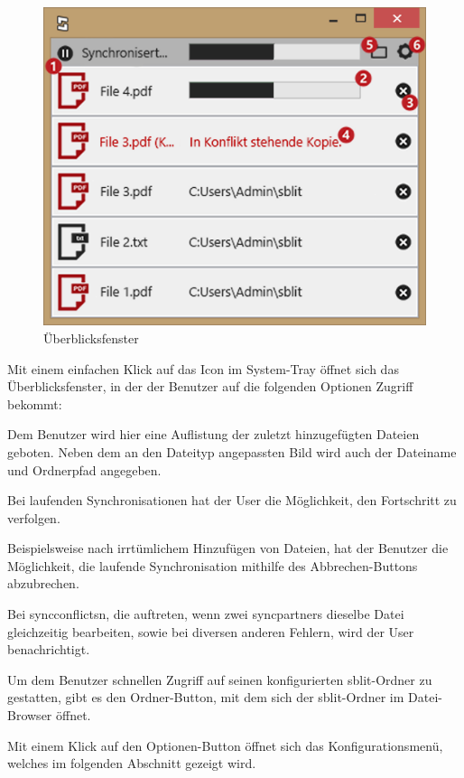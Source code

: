 \begin{figure}[H]
	\centering
	\includegraphics[scale=0.7]{images/ueberblicksfenster.png}
  \caption{Überblicksfenster}
	\label{ueberblicksfenster}
\end{figure}

Mit einem einfachen Klick auf das Icon im System-Tray öffnet sich das Überblicksfenster, in der der
Benutzer auf die folgenden Optionen Zugriff bekommt:

\begin{description}

		Dem Benutzer wird hier eine Auflistung der zuletzt hinzugefügten Dateien
		geboten. Neben dem an den Dateityp angepassten Bild wird auch der Dateiname
		und Ordnerpfad angegeben.

		Bei laufenden Synchronisationen hat der User die Möglichkeit, den
		Fortschritt zu verfolgen.

	  Beispielsweise nach irrtümlichem Hinzufügen von Dateien, hat der Benutzer die
		Möglichkeit, die laufende Synchronisation mithilfe des Abbrechen-Buttons
		abzubrechen.

		Bei \glspl{syncconflict}n, die auftreten, wenn zwei \glspl{syncpartner} dieselbe 
		Datei gleichzeitig bearbeiten, sowie bei diversen anderen Fehlern,
		wird der User benachrichtigt.

		Um dem Benutzer schnellen Zugriff auf seinen konfigurierten sblit-Ordner zu
		gestatten, gibt es den Ordner-Button, mit dem sich der sblit-Ordner im
		Datei-Browser öffnet.

		Mit einem Klick auf den Optionen-Button öffnet sich das Konfigurationsmenü,
		welches im folgenden Abschnitt gezeigt wird.
\end{description}
